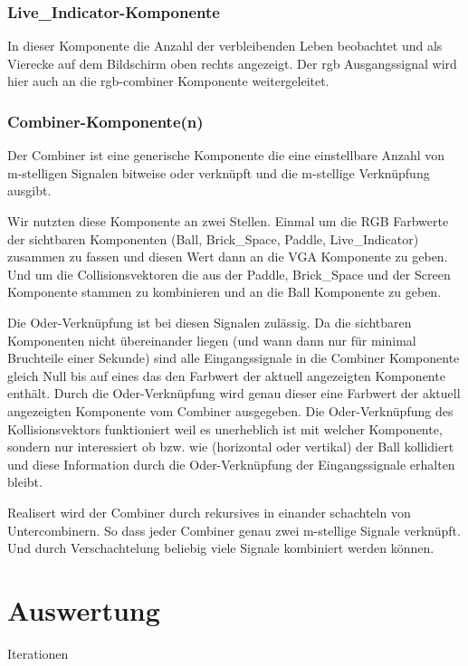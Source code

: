 \documentclass{scrartcl}
\begin{document}
\subsubsection{Live\_Indicator-Komponente}
In dieser Komponente die Anzahl der verbleibenden Leben beobachtet und als Vierecke auf dem Bildschirm oben rechts angezeigt.
Der rgb Ausgangssignal wird hier auch an die rgb-combiner Komponente weitergeleitet.


\subsubsection{Combiner-Komponente(n)}
Der Combiner ist eine generische Komponente die eine einstellbare Anzahl von
m-stelligen Signalen bitweise oder verknüpft und die m-stellige Verknüpfung
ausgibt.

Wir nutzten diese Komponente an zwei Stellen.
Einmal um die RGB Farbwerte der sichtbaren Komponenten (Ball, Brick\_Space,
Paddle, Live\_Indicator) zusammen zu fassen und diesen Wert dann an die VGA
Komponente zu geben.
Und um die Collisionsvektoren die aus der Paddle, Brick\_Space und der Screen
Komponente stammen zu kombinieren und an die Ball Komponente zu geben.

Die Oder-Verknüpfung ist bei diesen Signalen zulässig.
Da die sichtbaren Komponenten nicht übereinander liegen (und wann dann nur für
minimal Bruchteile einer Sekunde) sind alle Eingangssignale in die Combiner
Komponente gleich Null bis auf eines das den Farbwert der aktuell angezeigten
Komponente enthält. Durch die Oder-Verknüpfung wird genau dieser eine Farbwert
der aktuell angezeigten Komponente vom Combiner ausgegeben.
Die Oder-Verknüpfung des Kollisionsvektors funktioniert weil es unerheblich ist
mit welcher Komponente, sondern nur interessiert ob bzw. wie
(horizontal oder vertikal) der Ball kollidiert und diese Information durch die
Oder-Verknüpfung der Eingangssignale erhalten bleibt.

Realisert wird der Combiner durch rekursives in einander schachteln von Untercombinern.
So dass jeder Combiner genau zwei m-stellige Signale verknüpft.
Und durch Verschachtelung beliebig viele Signale kombiniert werden können.


\section{Auswertung}
Iterationen
\end{document}
